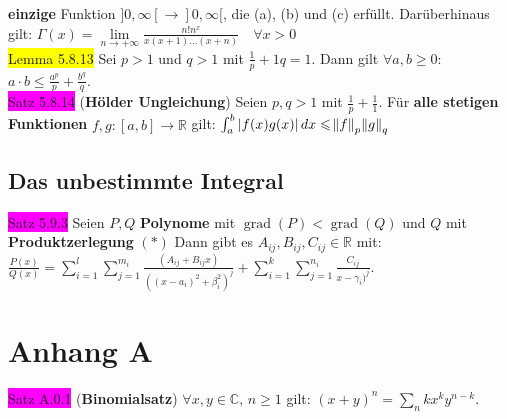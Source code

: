 \documentclass[landscape, 10pt]{article}
\newcommand{\R}{\mathbb{R}}
\newcommand{\C}{\mathbb{C}}
\begin{document}
\begin{multicols}{3}
                            \textbf{einzige} Funktion 
                            \textcolor{NavyBlue}{$]0,\infty[\longrightarrow]0,\infty[$},
                            die (a), (b) und (c) erfüllt. 
                            Darüberhinaus gilt: 
                            \textcolor{NavyBlue}{$\Gamma(x)
                            =\lim\limits_{n\to+\infty}\frac{n!n^x}{x(x+1)...(x+n)}\quad
                            \forall x>0$}\\
              \colorbox{yellow}{Lemma 5.8.13} Sei \textcolor{NavyBlue}{$p>1$} und 
                     \textcolor{NavyBlue}{$q>1$} mit 
                     \textcolor{NavyBlue}{$\frac{1}{p}+{1}{q}=1$}. Dann gilt 
                     \textcolor{NavyBlue}{$\forall a,b\geqslant0$}: 
                     \textcolor{NavyBlue}{
                     $a\cdot b\leqslant\frac{a^p}{p}+\frac{b^q}{q}$}.\\
              \colorbox{magenta}{Satz 5.8.14} 
              (\textbf{Hölder Ungleichung}) 
                     Seien \textcolor{NavyBlue}{$p,q>1$} mit 
                     \textcolor{NavyBlue}{$\frac{1}{p}+\frac{1}{1}$}. Für 
                     \textbf{alle stetigen Funktionen} 
                     \textcolor{NavyBlue}{$f,g:[a,b]\longrightarrow\R$} gilt: 
                     \textcolor{NavyBlue}{
                     $\int_a^b|f(x)g(x)|\,dx\leqslant\norm{f}_p\norm{g}_q$}\\
       \subsection{Das unbestimmte Integral}
              \colorbox{magenta}{Satz 5.9.3} 
                     Seien \textcolor{NavyBlue}{$P,Q$} \textbf{Polynome} mit 
                     \textcolor{NavyBlue}{
                     $\operatorname{grad}(P)<\operatorname{grad}(Q)$} und 
                     \textcolor{NavyBlue}{$Q$}
                     mit \textbf{Produktzerlegung} $(*)$ Dann gibt es 
                     \textcolor{NavyBlue}{$A_{ij},B_{ij},C_{ij}\in\R$} mit: 
                     \textcolor{NavyBlue}{$\frac{P(x)}{Q(x)}
                     =\sum_{i=1}^l\sum_{j=1}^{m_i}
                     \frac{(A_{ij}+B_{ij}x)}{((x-a_i)^2+\beta_i^2)^j}
                     +\sum_{i=1}^k\sum_{j=1}^{n_i}\frac{C_{ij}}{x-\gamma_i)^j}$}.


\section{Anhang A}
              \colorbox{magenta}{Satz A.0.1} (\textbf{Binomialsatz}) 
                     \textcolor{NavyBlue}{$\forall x,y\in\C,\,n\geqslant1$} gilt: 
                     \textcolor{NavyBlue}{$(x+y)^n=\sum_{n}{k}x^ky^{n-k}$}.



\end{multicols}
\end{document}
